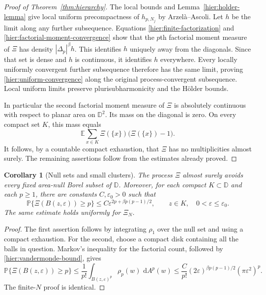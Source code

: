\documentclass[11pt,a4paper]{article}
\numberwithin{equation}{section}
\newtheorem{corollary}[theorem]{Corollary}
\theoremstyle{definition}
\theoremstyle{remark}
\newcommand{\D}{\mathbb D}
\newcommand{\E}{\mathbb E}
\newcommand{\Pbb}{\mathbb P}
\newcommand{\dd}{\,\mathrm d}
\begin{document}
\begin{proof}[Proof of Theorem~\ref{thm:hierarchy}]
The local bounds and Lemma~\ref{hier:holder-lemma} give local uniform
precompactness of $h_{p,N_j}$ by Arzel\`a--Ascoli.  Let $h$ be the
limit along any further subsequence.  Equations
\eqref{hier:finite-factorization} and
\eqref{hier:factorial-moment-convergence} show that the $p$th
factorial moment measure of $\Xi$ has density $|\Delta_p|^\beta h$.
This identifies $h$ uniquely away from the diagonals.  Since that set
is dense and $h$ is continuous, it identifies $h$ everywhere.
Every locally uniformly convergent further subsequence therefore has
the same limit, proving \eqref{hier:uniform-convergence} along the
original process-convergent subsequence.  Local uniform limits
preserve plurisubharmonicity and the H\"older bounds.

In particular the second factorial moment measure of $\Xi$ is
absolutely continuous with respect to planar area on $\D^2$.
Its mass on the diagonal is zero.  On every compact set $K$, this
mass equals
\[
 \E\sum_{x\in K}\Xi(\{x\})\bigl(\Xi(\{x\})-1\bigr).
\]
It follows, by a countable compact exhaustion, that $\Xi$ has no
multiplicities almost surely.  The remaining assertions follow from
the estimates already proved.
\end{proof}

\begin{corollary}[Null sets and small clusters]
\label{cor:hier-clusters}
The process $\Xi$ almost surely avoids every fixed area-null Borel
subset of $\D$.  Moreover, for each compact $K\subset\D$ and each
$p\ge1$, there are constants $C,\varepsilon_0>0$ such that
\begin{equation}
 \Pbb\{\Xi(B(z,\varepsilon))\ge p\}
 \le C\varepsilon^{2p+\beta p(p-1)/2},
 \qquad z\in K,\quad 0<\varepsilon\le\varepsilon_0.
 \label{hier:cluster-estimate}
\end{equation}
The same estimate holds uniformly for $\Xi_N$.
\end{corollary}

\begin{proof}
The first assertion follows by integrating $\rho_1$ over the null
set and using a compact exhaustion.  For the second, choose a compact
disk containing all the balls in question.  Markov's inequality for
the factorial count, followed by \eqref{hier:vandermonde-bound}, gives
\[
 \Pbb\{\Xi(B(z,\varepsilon))\ge p\}
 \le\frac1{p!}\int_{B(z,\varepsilon)^p}\rho_p(w)\,\dd A^p(w)
 \le\frac{C}{p!}(2\varepsilon)^{\beta p(p-1)/2}
                    (\pi\varepsilon^2)^p.
\]
The finite-$N$ proof is identical.
\end{proof}
\end{document}
